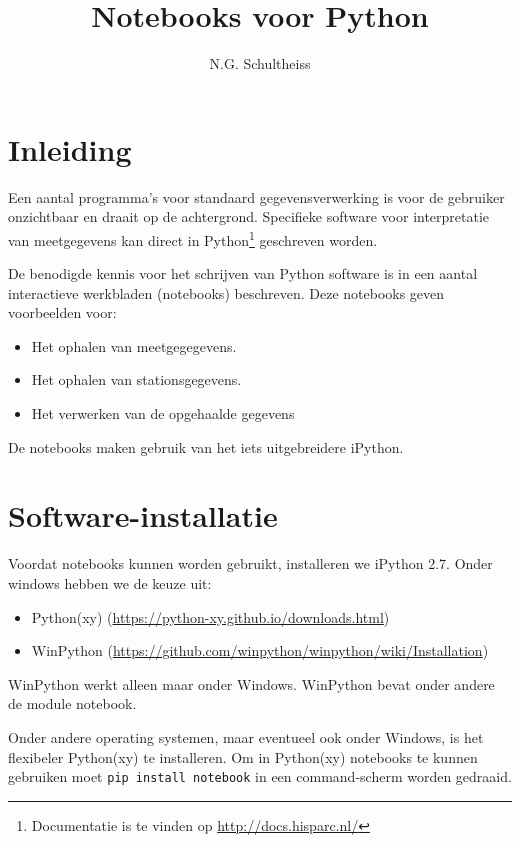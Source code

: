 

\title{Notebooks voor Python}
\author{N.G. Schultheiss}



\maketitle

\section{Inleiding}

Een aantal programma's voor standaard \hisparc gegevensverwerking is voor de gebruiker onzichtbaar 
en draait op de achtergrond. Specifieke software voor interpretatie van meetgegevens kan direct in 
Python\footnote{Documentatie is te vinden op \url{http://docs.hisparc.nl/}} geschreven worden.

De benodigde kennis voor het schrijven van Python software is in een aantal interactieve werkbladen
 (notebooks) beschreven. Deze notebooks geven voorbeelden voor:
\begin{itemize}
\item Het ophalen van meetgegegevens.
\item Het ophalen van stationsgegevens.
\item Het verwerken van de opgehaalde gegevens
\end{itemize}
De notebooks maken gebruik van het iets uitgebreidere iPython. 

\section{Software-installatie}

Voordat notebooks kunnen worden gebruikt, installeren we iPython 2.7. Onder windows hebben we de keuze uit:
\begin{itemize}
\item Python(xy) (\url{https://python-xy.github.io/downloads.html})
\item WinPython (\url{https://github.com/winpython/winpython/wiki/Installation})
\end{itemize} 

WinPython werkt alleen maar onder Windows. WinPython bevat onder andere de module notebook. 

Onder andere operating systemen, maar eventueel ook onder Windows, is het flexibeler Python(xy) te installeren. 
Om  in Python(xy) notebooks te kunnen gebruiken moet {\tt pip install notebook}  in een command-scherm worden 
gedraaid.

